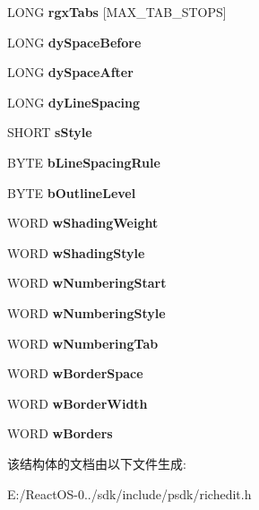 \begin{DoxyCompactItemize}
L\+O\+NG {\bfseries rgx\+Tabs} \mbox{[}M\+A\+X\+\_\+\+T\+A\+B\+\_\+\+S\+T\+O\+PS\mbox{]}
\item 
\mbox{\label{struct__paraformat2_a153e4827e0646836c072c0afd022e0dd}} 
L\+O\+NG {\bfseries dy\+Space\+Before}
\item 
\mbox{\label{struct__paraformat2_a8ae86c5d4b26c1452cad69561f4f3fdc}} 
L\+O\+NG {\bfseries dy\+Space\+After}
\item 
\mbox{\label{struct__paraformat2_a894a4319ebc0aa991bfbe3272173c880}} 
L\+O\+NG {\bfseries dy\+Line\+Spacing}
\item 
\mbox{\label{struct__paraformat2_a614805e2e95220582f6c9cbf04fb5098}} 
S\+H\+O\+RT {\bfseries s\+Style}
\item 
\mbox{\label{struct__paraformat2_a25bada3c4247d9fa99de1b49cc756a0c}} 
B\+Y\+TE {\bfseries b\+Line\+Spacing\+Rule}
\item 
\mbox{\label{struct__paraformat2_a067fb05c6c4f578b02604424965b021d}} 
B\+Y\+TE {\bfseries b\+Outline\+Level}
\item 
\mbox{\label{struct__paraformat2_a6ad97502cfd2b21b14ad1907a5f95b42}} 
W\+O\+RD {\bfseries w\+Shading\+Weight}
\item 
\mbox{\label{struct__paraformat2_a42fe5ef6807d43b75a1abd7bec1cb0d3}} 
W\+O\+RD {\bfseries w\+Shading\+Style}
\item 
\mbox{\label{struct__paraformat2_a2192fbb714d7a28094b1155c32b93c1c}} 
W\+O\+RD {\bfseries w\+Numbering\+Start}
\item 
\mbox{\label{struct__paraformat2_a86a0fa8a35ff2cb8b4ee5fbfe3c434a4}} 
W\+O\+RD {\bfseries w\+Numbering\+Style}
\item 
\mbox{\label{struct__paraformat2_afcadab62cfac92c9b059cb7ced10c57e}} 
W\+O\+RD {\bfseries w\+Numbering\+Tab}
\item 
\mbox{\label{struct__paraformat2_a3ac06772a8b5ed25c22c4ccbcc6b0357}} 
W\+O\+RD {\bfseries w\+Border\+Space}
\item 
\mbox{\label{struct__paraformat2_aab28400007f6cc9c99b64f287f1d40ad}} 
W\+O\+RD {\bfseries w\+Border\+Width}
\item 
\mbox{\label{struct__paraformat2_abaff0f7945fbb4b3c5048f769d32d97c}} 
W\+O\+RD {\bfseries w\+Borders}
\end{DoxyCompactItemize}


该结构体的文档由以下文件生成\+:\begin{DoxyCompactItemize}
\item 
E\+:/\+React\+O\+S-\/0../sdk/include/psdk/richedit.\+h\end{DoxyCompactItemize}
